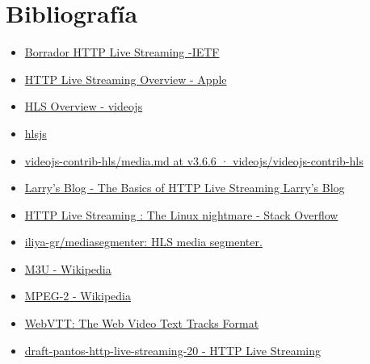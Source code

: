 \section{Bibliografía}\label{bibliografuxeda}

\begin{itemize}
\tightlist
\item
  \href{https://datatracker.ietf.org/doc/draft-pantos-http-live-streaming/}{Borrador
  HTTP Live Streaming -IETF}
\item
  \href{https://developer.apple.com/library/content/documentation/NetworkingInternet/Conceptual/StreamingMediaGuide/Introduction/Introduction.html}{HTTP
  Live Streaming Overview - Apple}
\item
  \href{https://github.com/videojs/videojs-contrib-hls/blob/v3.6.6/docs/arch.md}{HLS
  Overview - videojs}
\item
  \href{https://github.com/dailymotion/hls.js}{hlsjs}
\item
  \href{https://github.com/videojs/videojs-contrib-hls/blob/v3.6.6/docs/media.md}{videojs-contrib-hls/media.md
  at v3.6.6 · videojs/videojs-contrib-hls}
\item
  \href{https://web.archive.org/web/20150507134022/http://www.larryjordan.biz/app_bin/wordpress/archives/2369}{Larry's
  Blog - The Basics of HTTP Live Streaming \textbar{} Larry's Blog}
\item
  \href{https://stackoverflow.com/questions/10971039/http-live-streaming-the-linux-nightmare}{HTTP
  Live Streaming : The Linux nightmare - Stack Overflow}
\item
  \href{https://github.com/iliya-gr/mediasegmenter}{iliya-gr/mediasegmenter:
  HLS media segmenter.}
\item
  \href{https://en.m.wikipedia.org/wiki/M3U}{M3U - Wikipedia}
\item
  \href{https://en.m.wikipedia.org/wiki/MPEG-2}{MPEG-2 - Wikipedia}
\item
  \href{https://w3c.github.io/webvtt/}{WebVTT: The Web Video Text Tracks
  Format}
\item
  \href{https://tools.ietf.org/html/draft-pantos-http-live-streaming-20}{draft-pantos-http-live-streaming-20
  - HTTP Live Streaming}
\end{itemize}

